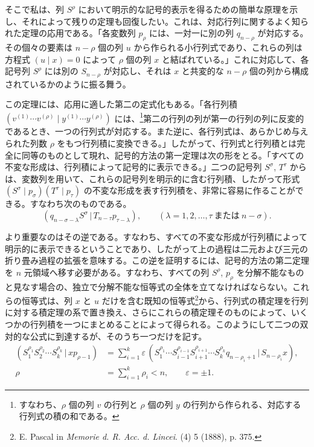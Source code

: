 \documentclass[11pt]{jlreq}
\newcommand{\pair}[2]{(#1\,|\,#2)}
\newcommand{\eps}{\varepsilon}
\begin{document}
そこで私は、列 $S^\rho$ において明示的な記号的表示を得るための簡単な原理を示し、それによって残りの定理も回復したい。これは、対応行列に関するよく知られた定理の応用である。「各変数列 $p_\rho$ には、一対一に別の列 $q_{n-\rho}$ が対応する。その個々の要素は $n-\rho$ 個の列 $u$ から作られる小行列式であり、これらの列は方程式 $(u\mid x)=0$ によって $\rho$ 個の列 $x$ と結ばれている。」これに対応して、各記号列 $S^\rho$ には別の $S_{n-\rho}$ が対応し、それは $x$ と共変的な $n-\rho$ 個の列から構成されているかのように振る舞う。

この定理には、応用に適した第二の定式化もある。「各行列積 $(v^{(1)}\cdots v^{(\rho)}\mid y^{(1)}\cdots y^{(\rho)})$ には、\footnote{すなわち、$\rho$ 個の列 $v$ の行列と $\rho$ 個の列 $y$ の行列から作られる、対応する行列式の積の和である。}第二の行列の列が第一の行列の列に反変的であるとき、一つの行列式が対応する。また逆に、各行列式は、あらかじめ与えられた列数 $\rho$ をもつ行列積に変換できる。」したがって、行列式と行列積とは完全に同等のものとして現れ、記号的方法の第一定理は次の形をとる。「すべての不変な形成は、行列積によって記号的に表示できる。」二つの記号列 $S^\sigma$, $T^\tau$ からは、変数列を用いて、これらの記号列を明示的に含む行列積、したがって形式 $(S^\sigma\mid p_\sigma)(T^\tau\mid p_\tau)$ の不変な形成を表す行列積を、非常に容易に作ることができる。すなわち次のものである。
\begin{equation}
 \pair{q_{n-\sigma-\lambda}S^\sigma}{T_{n-\tau}p_{\tau-\lambda}},
 \qquad (\lambda=1,2,\ldots,\tau\ \text{または}\ n-\sigma).
\tag{1}
\end{equation}

より重要なのはその逆である。すなわち、すべての不変な形成が行列積によって明示的に表示できるということであり、したがって上の過程は二元および三元の折り畳み過程の拡張を意味する。この逆を証明するには、記号的方法の第二定理を $n$ 元領域へ移す必要がある。すなわち、すべての列 $S^\rho$, $p_\rho$ を分解不能なものと見なす場合の、独立で分解不能な恒等式の全体を立てなければならない。これらの恒等式は、列 $x$ と $u$ だけを含む既知の恒等式\footnote{E. Pascal in \emph{Memorie d. R. Acc. d. Lincei}. (4) 5 (1888), p. 375.}から、行列式の積定理を行列に対する積定理の系で置き換え、さらにこれらの積定理そのものによって、いくつかの行列積を一つにまとめることによって得られる。このようにして二つの双対的な公式に到達するが、そのうち一つだけを記す。
\begin{equation}
\begin{aligned}
 \pair{S_1^{\rho_1}S_2^{\rho_2}\cdots S_k^{\rho_k}}{x p_{\rho-1}}
 &=\sum_{i=1}^{k}\eps\,\pair{S_1^{\rho_1}\cdots S_{i-1}^{\rho_{i-1}}S_{i+1}^{\rho_{i+1}}\cdots S_k^{\rho_k}q_{n-\rho_i+1}}{S_{n-\rho_i}x},\\
 \rho&=\sum_{i=1}^{k}\rho_i<n,\qquad \eps=\pm1.
\end{aligned}
\tag{2}
\end{equation}
\end{document}
